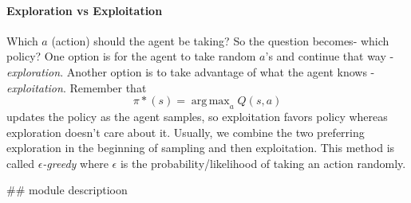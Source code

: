 \documentclass{article}
\DeclareMathOperator*{\argmax}{arg\,max}
\begin{document}
\paragraph{Exploration vs Exploitation}
Which $a$ (action) should the agent be taking? So the question becomes- which policy? One option is for the agent to take random $a$'s and continue that way - \emph{exploration}. Another option is to take advantage of what the agent knows - \emph{exploitation}.
Remember that $$\pi*(s)=\argmax_a Q(s,a)$$ updates the policy as the agent samples, so exploitation favors policy whereas exploration doesn't care about it. Usually, we combine the two preferring exploration in the beginning of sampling and then exploitation. This method is called \emph{$\epsilon$-greedy} where $\epsilon$ is the probability/likelihood of taking an action randomly.

## module descriptioon
\end{document}
